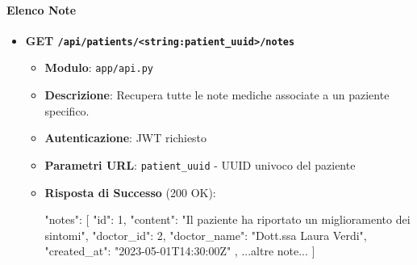\documentclass[12pt,a4paper,oneside]{report}
\begin{document}
\paragraph{Elenco Note}
\begin{itemize}
    \item \textbf{GET \texttt{/api/patients/<string:patient\_uuid>/notes}}
          \begin{itemize}
              \item \textbf{Modulo}: \texttt{app/api.py}
              \item \textbf{Descrizione}: Recupera tutte le note mediche associate a un paziente specifico.
              \item \textbf{Autenticazione}: JWT richiesto
              \item \textbf{Parametri URL}: \texttt{patient\_uuid} - UUID univoco del paziente
              \item \textbf{Risposta di Successo} (200 OK):
                    \begin{spverbatim}
                        {
                        "notes": [
                        {
                                "id": 1,
                                "content": "Il paziente ha riportato un miglioramento dei sintomi",
                                "doctor_id": 2,
                                "doctor_name": "Dott.ssa Laura Verdi",
                                "created_at": "2023-05-01T14:30:00Z"
                            },
                        ...altre note...
                        ]
                        }
                    \end{spverbatim}
          \end{itemize}
\end{itemize}
\end{document}

